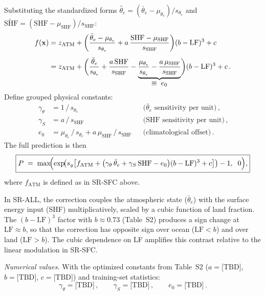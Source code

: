 Substituting the standardized forms $\hat{\theta}_e = (\bar{\theta}_e -
\mu_{\theta_e})/s_{\theta_e}$ and $\widetilde{\mathrm{SHF}} = (\mathrm{SHF}
- \mu_{\mathrm{SHF}})/s_{\mathrm{SHF}}$:
%
\begin{align}
  f(\mathbf{x}) &= z_{\mathrm{ATM}}
    + \biggl(\frac{\bar{\theta}_e - \mu_{\theta_e}}{s_{\theta_e}}
    + a\,\frac{\mathrm{SHF} - \mu_{\mathrm{SHF}}}{s_{\mathrm{SHF}}}\biggr)
    (b - \mathrm{LF})^3 + c \notag\\[4pt]
    &= z_{\mathrm{ATM}}
    + \biggl(\frac{\bar{\theta}_e}{s_{\theta_e}}
    + \frac{a\,\mathrm{SHF}}{s_{\mathrm{SHF}}}
    - \underbrace{\frac{\mu_{\theta_e}}{s_{\theta_e}}
    - \frac{a\,\mu_{\mathrm{SHF}}}{s_{\mathrm{SHF}}}}_{\displaystyle
    \equiv\; e_0}\biggr)(b - \mathrm{LF})^3 + c\,.
  \label{eq:s-srall-expand}
\end{align}
%
Define grouped physical constants:
%
\begin{equation}
  \begin{aligned}
    \gamma_\theta &= 1\,/\,s_{\theta_e}
      &&\text{($\bar{\theta}_e$ sensitivity per unit)}\,,\\
    \gamma_S &= a\,/\,s_{\mathrm{SHF}}
      &&\text{(SHF sensitivity per unit)}\,,\\
    e_0 &= \mu_{\theta_e}\,/\,s_{\theta_e}
         + a\,\mu_{\mathrm{SHF}}\,/\,s_{\mathrm{SHF}}
      &&\text{(climatological offset)}\,.
  \end{aligned}
  \label{eq:s-srall-constants}
\end{equation}
%
The full prediction is then
%
\begin{equation}
  \boxed{P \;=\; \max\!\Bigl(\exp\!\bigl(
    s_y\bigl[f_{\mathrm{ATM}}
    + \bigl(\gamma_\theta\,\bar{\theta}_e
    + \gamma_S\,\mathrm{SHF} - e_0\bigr)
    (b - \mathrm{LF})^3 + c\bigr]\bigr) - 1,\;\;0\Bigr),}
  \label{eq:s-srall-phys}
\end{equation}
%
where $f_{\mathrm{ATM}}$ is defined as in SR-SFC above.

In SR-ALL, the correction couples the atmospheric state ($\bar{\theta}_e$)
with the surface energy input (SHF) multiplicatively, scaled by a cubic
function of land fraction.  The $(b - \mathrm{LF})^3$ factor with $b \approx
0.73$ (Table~S2) produces a sign change at $\mathrm{LF} \approx b$, so that
the correction has opposite sign over ocean ($\mathrm{LF} < b$) and over
land ($\mathrm{LF} > b$).  The cubic dependence on LF amplifies this contrast
relative to the linear modulation in SR-SFC.

\vspace{0.3em}
\noindent\textit{Numerical values.}  With the optimized constants from
Table~S2 ($a = \text{[TBD]}$, $b = \text{[TBD]}$, $c = \text{[TBD]}$)
and training-set statistics:
%
\begin{equation*}
  \gamma_\theta = \text{[TBD]}\,,\qquad
  \gamma_S = \text{[TBD]}\,,\qquad
  e_0 = \text{[TBD]}\,.
\end{equation*}


